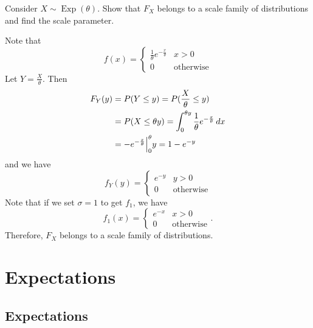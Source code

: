 \documentclass[notoc,notitlepage]{tufte-book}
\DeclareMathOperator{\Exp}{Exp }
\begin{document}
\begin{eg}[Example 2.15]
  Consider $X \sim \Exp(\theta)$. Show that $F_X$ belongs to a scale family of distributions and find the scale parameter.

  Note that
  \begin{equation*}
    f(x) = \begin{cases}
      \frac{1}{\theta} e^{- \frac{x}{\theta}} & x > 0 \\
      0                                       & \text{otherwise}
    \end{cases}
  \end{equation*}
  Let $Y = \frac{X}{\theta}$. Then
  \begin{align*}
    F_Y (y) &= P(Y \leq y) = P(\frac{X}{\theta} \leq y) \\
            &= P(X \leq \theta y) = \int_{0}^{\theta y} \frac{1}{\theta} e^{-\frac{x}{\theta}} \mathop{}\!d{x} \\
            &= - e^{- \frac{x}{\theta}} \Big|_{0}^{\theta}{y} = 1 - e^{-y}
  \end{align*}
  and we have
  \begin{equation*}
    f_Y(y) = \begin{cases}
      e^{-y} & y > 0 \\
      0      & \text{otherwise}
    \end{cases}
  \end{equation*}
  Note that if we set $\sigma = 1$ to get $f_1$, we have
  \begin{equation*}
    f_1(x) = \begin{cases}
      e^{-x} & x > 0 \\
      0      & \text{otherwise}
    \end{cases}.
  \end{equation*}
  Therefore, $F_X$ belongs to a scale family of distributions.
\end{eg}


\section{Expectations}%
\label{sec:expectations}

\subsection{Expectations}%
\label{sub:expectations}
\end{document}
